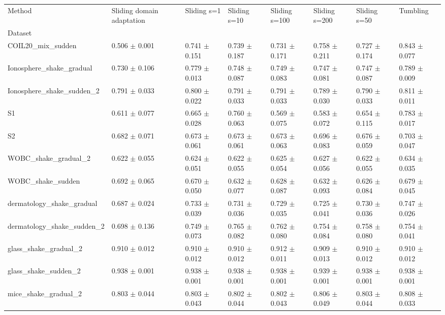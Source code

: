 \begin{tabular}{llllllll}
\toprule
Method & Sliding domain adaptation & Sliding s=1 & Sliding s=10 & Sliding s=100 & Sliding s=200 & Sliding s=50 & Tumbling \\
Dataset &  &  &  &  &  &  &  \\
\midrule
COIL20_mix_sudden & 0.506 $\pm$ 0.001 & 0.741 $\pm$ 0.151 & 0.739 $\pm$ 0.187 & 0.731 $\pm$ 0.171 & 0.758 $\pm$ 0.211 & 0.727 $\pm$ 0.174 & 0.843 $\pm$ 0.077 \\
Ionosphere_shake_gradual & 0.730 $\pm$ 0.106 & 0.779 $\pm$ 0.013 & 0.748 $\pm$ 0.087 & 0.749 $\pm$ 0.083 & 0.747 $\pm$ 0.081 & 0.747 $\pm$ 0.087 & 0.789 $\pm$ 0.009 \\
Ionosphere_shake_sudden_2 & 0.791 $\pm$ 0.033 & 0.800 $\pm$ 0.022 & 0.791 $\pm$ 0.033 & 0.791 $\pm$ 0.033 & 0.789 $\pm$ 0.030 & 0.790 $\pm$ 0.033 & 0.811 $\pm$ 0.011 \\
S1 & 0.611 $\pm$ 0.077 & 0.665 $\pm$ 0.028 & 0.760 $\pm$ 0.063 & 0.569 $\pm$ 0.075 & 0.583 $\pm$ 0.072 & 0.654 $\pm$ 0.115 & 0.783 $\pm$ 0.017 \\
S2 & 0.682 $\pm$ 0.071 & 0.673 $\pm$ 0.061 & 0.673 $\pm$ 0.061 & 0.673 $\pm$ 0.063 & 0.696 $\pm$ 0.083 & 0.676 $\pm$ 0.059 & 0.703 $\pm$ 0.047 \\
WOBC_shake_gradual_2 & 0.622 $\pm$ 0.055 & 0.624 $\pm$ 0.051 & 0.622 $\pm$ 0.055 & 0.625 $\pm$ 0.054 & 0.627 $\pm$ 0.056 & 0.622 $\pm$ 0.055 & 0.634 $\pm$ 0.035 \\
WOBC_shake_sudden & 0.692 $\pm$ 0.065 & 0.670 $\pm$ 0.050 & 0.632 $\pm$ 0.077 & 0.628 $\pm$ 0.087 & 0.632 $\pm$ 0.093 & 0.626 $\pm$ 0.084 & 0.679 $\pm$ 0.045 \\
dermatology_shake_gradual & 0.687 $\pm$ 0.024 & 0.733 $\pm$ 0.039 & 0.731 $\pm$ 0.036 & 0.729 $\pm$ 0.035 & 0.725 $\pm$ 0.041 & 0.730 $\pm$ 0.036 & 0.747 $\pm$ 0.026 \\
dermatology_shake_sudden_2 & 0.698 $\pm$ 0.136 & 0.749 $\pm$ 0.073 & 0.765 $\pm$ 0.082 & 0.762 $\pm$ 0.080 & 0.754 $\pm$ 0.084 & 0.758 $\pm$ 0.080 & 0.754 $\pm$ 0.041 \\
glass_shake_gradual_2 & 0.910 $\pm$ 0.012 & 0.910 $\pm$ 0.012 & 0.910 $\pm$ 0.012 & 0.912 $\pm$ 0.011 & 0.909 $\pm$ 0.013 & 0.910 $\pm$ 0.012 & 0.910 $\pm$ 0.012 \\
glass_shake_sudden_2 & 0.938 $\pm$ 0.001 & 0.938 $\pm$ 0.001 & 0.938 $\pm$ 0.001 & 0.938 $\pm$ 0.001 & 0.939 $\pm$ 0.001 & 0.938 $\pm$ 0.001 & 0.938 $\pm$ 0.001 \\
mice_shake_gradual_2 & 0.803 $\pm$ 0.044 & 0.803 $\pm$ 0.043 & 0.802 $\pm$ 0.044 & 0.802 $\pm$ 0.043 & 0.806 $\pm$ 0.049 & 0.803 $\pm$ 0.044 & 0.808 $\pm$ 0.033 \\

\end{tabular}
